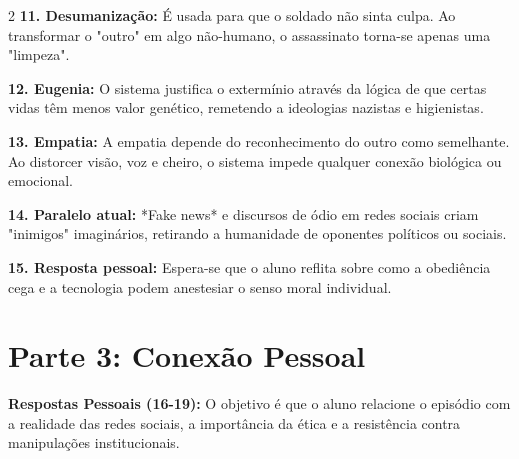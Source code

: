 \documentclass[11pt]{article}
\begin{document}
\begin{multicols}{2}
\textbf{11. Desumanização:} É usada para que o soldado não sinta culpa. Ao transformar o "outro" em algo não-humano, o assassinato torna-se apenas uma "limpeza".

\textbf{12. Eugenia:} O sistema justifica o extermínio através da lógica de que certas vidas têm menos valor genético, remetendo a ideologias nazistas e higienistas.

\textbf{13. Empatia:} A empatia depende do reconhecimento do outro como semelhante. Ao distorcer visão, voz e cheiro, o sistema impede qualquer conexão biológica ou emocional.

\textbf{14. Paralelo atual:} *Fake news* e discursos de ódio em redes sociais criam "inimigos" imaginários, retirando a humanidade de oponentes políticos ou sociais.

\textbf{15. Resposta pessoal:} Espera-se que o aluno reflita sobre como a obediência cega e a tecnologia podem anestesiar o senso moral individual.

\section*{Parte 3: Conexão Pessoal}

\textbf{Respostas Pessoais (16-19):} O objetivo é que o aluno relacione o episódio com a realidade das redes sociais, a importância da ética e a resistência contra manipulações institucionais.

\end{multicols}
\end{document}
